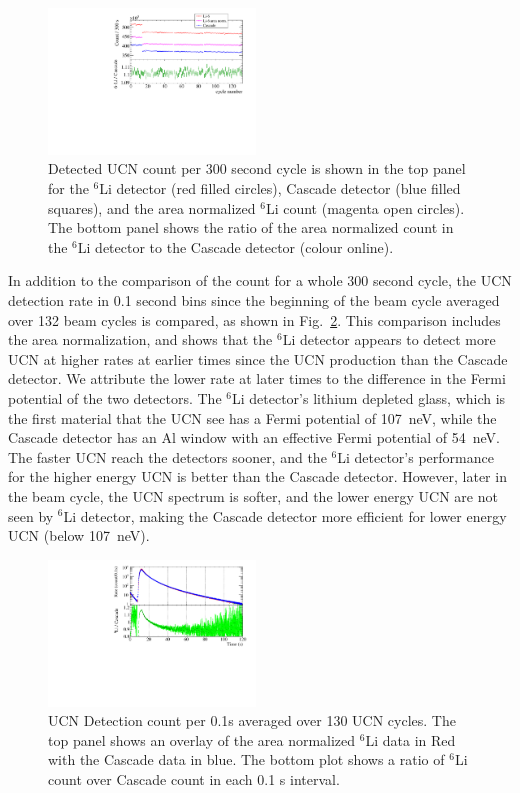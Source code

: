 \documentclass[review]{elsarticle}
\begin{document}
\begin{figure}[!htpb]
\centering \includegraphics[width=0.49\textwidth]{figures/cascade_to_li_ratecompare.pdf}
\caption{Detected UCN count per 300 second cycle is shown in the top
  panel for the ${^6}$Li detector (red filled circles), Cascade
  detector (blue filled squares), and the area normalized ${^6}$Li
  count (magenta open circles).  The bottom panel shows the ratio of
  the area normalized count in the $^{6}$Li detector to the Cascade
  detector (colour online).}
\label{fig:ratecompare}
\end{figure}

In addition to the comparison of the count for a whole 300 second
cycle, the UCN detection rate in 0.1 second bins since the beginning
of the beam cycle averaged over 132 beam cycles is compared, as shown in
Fig.~\ref{fig:averagedRate}.  This comparison includes the area
normalization, and shows that the $^{6}$Li detector appears to detect
more UCN at higher rates at earlier times since the UCN production
than the Cascade detector.  We attribute the lower rate at later times
to the difference in the Fermi potential of the two detectors.  The
$^6$Li detector's lithium depleted glass, which is the first material
that the UCN see has a Fermi potential of 107~neV, while the Cascade
detector has an Al window with an effective Fermi potential of 54~neV.
The faster UCN reach the detectors sooner, and the $^6$Li detector's
performance for the higher energy UCN is better than the Cascade
detector.  However, later in the beam cycle, the UCN spectrum is
softer, and the lower energy UCN are not seen by $^{6}$Li detector,
making the Cascade detector more efficient for lower energy UCN (below
107~neV).

\begin{figure}[!htpb]
\centering \includegraphics[width = 0.49\textwidth]{figures/cascade_to_li_130cycleavg.pdf}
\caption{UCN Detection count per 0.1s averaged over 130 UCN cycles.
  The top panel shows an overlay of the area normalized $^6$Li data in
  Red with the Cascade data in blue.  The bottom plot shows a ratio of
  $^6$Li count over Cascade count in each 0.1 s interval. }
\label{fig:averagedRate}
\end{figure}
\end{document}
